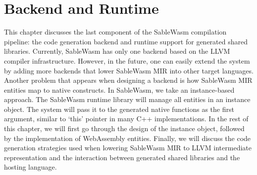 \chapter{Backend and Runtime}
\label{chapter:backend-and-runtime}

This chapter discusses the last component of the SableWasm compilation pipeline:
the code generation backend and runtime support for generated shared libraries.
Currently, SableWasm has only one backend based on the LLVM compiler
infrastructure. However, in the future, one can easily extend the system by
adding more backends that lower SableWasm MIR into other target languages.
Another problem that appears when designing a backend is how SableWasm MIR
entities map to native constructs. In SableWasm, we take an instance-based
approach. The SableWasm runtime library will manage all entities in an instance
object. The system will pass it to the generated native functions as the first
argument, similar to `this' pointer in many C++ implementations. In the rest of
this chapter, we will first go through the design of the instance object,
followed by the implementation of WebAssembly entities. Finally, we will
discuss the code generation strategies used when lowering SableWasm MIR to LLVM
intermediate representation and the interaction between generated shared
libraries and the hosting language.





